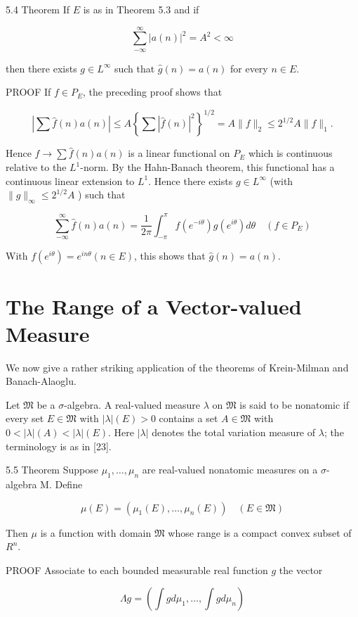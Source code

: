 \documentclass[10pt]{article}
\begin{document}
5.4 Theorem If $E$ is as in Theorem 5.3 and if

$$
\sum_{-\infty}^{\infty}|a(n)|^{2}=A^{2}<\infty
$$

then there exists $g \in L^{\infty}$ such that $\hat{g}(n)=a(n)$ for every $n \in E$.

PROOF If $f \in P_{E}$, the preceding proof shows that

$$
\left|\sum \hat{f}(n) a(n)\right| \leq A\left\{\sum|\hat{f}(n)|^{2}\right\}^{1 / 2}=A\|f\|_{2} \leq 2^{1 / 2} A\|f\|_{1} .
$$

Hence $f \rightarrow \sum \hat{f}(n) a(n)$ is a linear functional on $P_{E}$ which is continuous relative to the $L^{1}$-norm. By the Hahn-Banach theorem, this functional has a continuous linear extension to $L^{1}$. Hence there exists $g \in L^{\infty}$ (with $\|g\|_{\infty} \leq 2^{1 / 2} A$ ) such that

$$
\sum_{-\infty}^{\infty} \hat{f}(n) a(n)=\frac{1}{2 \pi} \int_{-\pi}^{\pi} f\left(e^{-i \theta}\right) g\left(e^{i \theta}\right) d \theta \quad\left(f \in P_{E}\right)
$$

With $f\left(e^{i \theta}\right)=e^{i n \theta}(n \in E)$, this shows that $\hat{g}(n)=a(n)$.

\section{The Range of a Vector-valued Measure}
We now give a rather striking application of the theorems of Krein-Milman and Banach-Alaoglu.

Let $\mathfrak{M}$ be a $\sigma$-algebra. A real-valued measure $\lambda$ on $\mathfrak{M}$ is said to be nonatomic if every set $E \in \mathfrak{M}$ with $|\lambda|(E)>0$ contains a set $A \in \mathfrak{M}$ with $0<|\lambda|(A)<|\lambda|(E)$. Here $|\lambda|$ denotes the total variation measure of $\lambda$; the terminology is as in [23].

5.5 Theorem Suppose $\mu_{1}, \ldots, \mu_{n}$ are real-valued nonatomic measures on a $\sigma$-algebra M. Define

$$
\mu(E)=\left(\mu_{1}(E), \ldots, \mu_{n}(E)\right) \quad(E \in \mathfrak{M})
$$

Then $\mu$ is a function with domain $\mathfrak{M}$ whose range is a compact convex subset of $R^{n}$.

PROOF Associate to each bounded measurable real function $g$ the vector

$$
\Lambda g=\left(\int g d \mu_{1}, \ldots, \int g d \mu_{n}\right)
$$
\end{document}
